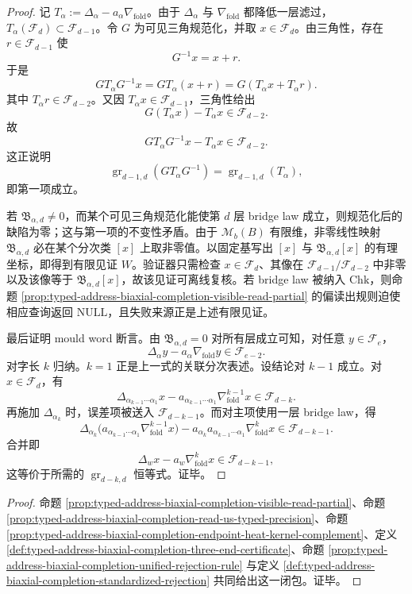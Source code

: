 \begin{proof}
记 \(T_\alpha:=\Delta_\alpha-a_\alpha\nabla_{\mathrm{fold}}\)。由于 \(\Delta_\alpha\) 与 \(\nabla_{\mathrm{fold}}\) 都降低一层滤过，\(T_\alpha(\mathcal F_d)\subset \mathcal F_{d-1}\)。令 \(G\) 为可见三角规范化，并取 \(x\in\mathcal F_d\)。由三角性，存在 \(r\in\mathcal F_{d-1}\) 使
\[
G^{-1}x=x+r.
\]
于是
\[
G T_\alpha G^{-1}x=G T_\alpha(x+r)=G(T_\alpha x+T_\alpha r).
\]
其中 \(T_\alpha r\in\mathcal F_{d-2}\)。又因 \(T_\alpha x\in\mathcal F_{d-1}\)，三角性给出
\[
G(T_\alpha x)-T_\alpha x\in\mathcal F_{d-2}.
\]
故
\[
G T_\alpha G^{-1}x-T_\alpha x\in\mathcal F_{d-2}.
\]
这正说明
\[
\operatorname{gr}_{d-1,d}(G T_\alpha G^{-1})=\operatorname{gr}_{d-1,d}(T_\alpha),
\]
即第一项成立。

若 \(\mathfrak B_{\alpha,d}\neq0\)，而某个可见三角规范化能使第 \(d\) 层 bridge law 成立，则规范化后的缺陷为零；这与第一项的不变性矛盾。由于 \(\mathcal M_b(B)\) 有限维，非零线性映射 \(\mathfrak B_{\alpha,d}\) 必在某个分次类 \([x]\) 上取非零值。以固定基写出 \([x]\) 与 \(\mathfrak B_{\alpha,d}[x]\) 的有理坐标，即得到有限见证 \(W\)。验证器只需检查 \(x\in\mathcal F_d\)、其像在 \(\mathcal F_{d-1}/\mathcal F_{d-2}\) 中非零以及该像等于 \(\mathfrak B_{\alpha,d}[x]\)，故该见证可离线复核。若 bridge law 被纳入 \(\mathrm{Chk}\)，则命题 \ref{prop:typed-address-biaxial-completion-visible-read-partial} 的偏读出规则迫使相应查询返回 \(\mathrm{NULL}\)，且失败来源正是上述有限见证。

最后证明 mould word 断言。由 \(\mathfrak B_{\alpha,d}=0\) 对所有层成立可知，对任意 \(y\in\mathcal F_e\)，
\[
\Delta_\alpha y-a_\alpha\nabla_{\mathrm{fold}}y\in\mathcal F_{e-2}.
\]
对字长 \(k\) 归纳。\(k=1\) 正是上一式的关联分次表述。设结论对 \(k-1\) 成立。对 \(x\in\mathcal F_d\)，有
\[
\Delta_{\alpha_{k-1}\cdots\alpha_1}x-a_{\alpha_{k-1}\cdots\alpha_1}\nabla_{\mathrm{fold}}^{k-1}x\in\mathcal F_{d-k}.
\]
再施加 \(\Delta_{\alpha_k}\) 时，误差项被送入 \(\mathcal F_{d-k-1}\)。而对主项使用一层 bridge law，得
\[
\Delta_{\alpha_k}\bigl(a_{\alpha_{k-1}\cdots\alpha_1}\nabla_{\mathrm{fold}}^{k-1}x\bigr)
-a_{\alpha_k}a_{\alpha_{k-1}\cdots\alpha_1}\nabla_{\mathrm{fold}}^k x
\in \mathcal F_{d-k-1}.
\]
合并即
\[
\Delta_w x-a_w\nabla_{\mathrm{fold}}^k x\in\mathcal F_{d-k-1},
\]
这等价于所需的 \(\operatorname{gr}_{d-k,d}\) 恒等式。证毕。
\end{proof}

\begin{proof}
命题 \ref{prop:typed-address-biaxial-completion-visible-read-partial}、命题 \ref{prop:typed-address-biaxial-completion-read-us-typed-precision}、命题 \ref{prop:typed-address-biaxial-completion-endpoint-heat-kernel-complement}、定义 \ref{def:typed-address-biaxial-completion-three-end-certificate}、命题 \ref{prop:typed-address-biaxial-completion-unified-rejection-rule} 与定义 \ref{def:typed-address-biaxial-completion-standardized-rejection} 共同给出这一闭包。证毕。
\end{proof}


